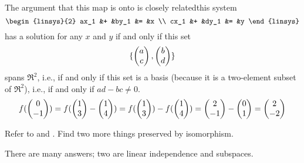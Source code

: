 \begin{exercises}
\begin{answer}
\begin{exparts}
          The argument that this map is onto is closely related\Dash this system
          \begin{equation*}
            \begin{linsys}{2}
              ax_1  &+  &by_1  &=  &x  \\
              cx_1  &+  &dy_1  &=  &y  
            \end{linsys}
          \end{equation*}
          has a solution for any \( x \) and \( y \) if and only if
          this set
          \begin{equation*}
            \mbox{$\{\begin{pmatrix} a \\ c \end{pmatrix},
                 \begin{pmatrix} b \\ d \end{pmatrix} \}$}
          \end{equation*}
          spans \( \Re^2 \), i.e., if and only if this set is 
          a basis (because it is a two-element subset of $\Re^2$), 
          i.e., if and only if \( ad-bc\neq 0 \).
        \partsitem
          \begin{equation*}
            f(\begin{pmatrix} 0 \\ -1 \end{pmatrix})=f(\begin{pmatrix} 1 \\ 3 \end{pmatrix}-\begin{pmatrix} 1 \\ 4 \end{pmatrix})
            =f(\begin{pmatrix} 1 \\ 3 \end{pmatrix})-f(\begin{pmatrix} 1 \\ 4 \end{pmatrix})
            =\begin{pmatrix} 2 \\ -1 \end{pmatrix}-\begin{pmatrix} 0 \\ 1 \end{pmatrix}
            =\begin{pmatrix} 2 \\ -2 \end{pmatrix}
          \end{equation*}
      \end{exparts}    
    \end{answer}
  \item 
     Refer to  and
     . 
     Find two more things preserved by isomorphism.
     \begin{answer}
       There are many answers; two are linear independence and
       subspaces.  


\end{answer}
\end{exercises}
